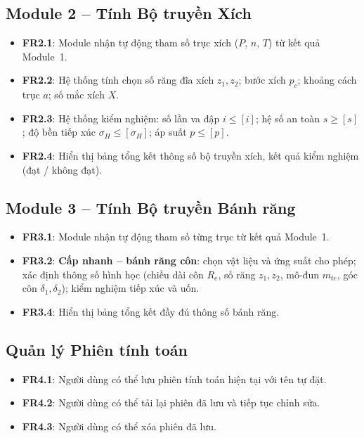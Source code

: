 \subsection{Module 2 -- Tính Bộ truyền Xích}

\begin{itemize}
  \item \textbf{FR2.1}: Module nhận tự động tham số trục xích
        ($P$, $n$, $T$) từ kết quả Module~1.
  \item \textbf{FR2.2}: Hệ thống tính chọn số răng đĩa xích $z_1, z_2$;
        bước xích $p_c$; khoảng cách trục $a$; số mắc xích $X$.
  \item \textbf{FR2.3}: Hệ thống kiểm nghiệm: số lần va đập $i \leq [i]$;
        hệ số an toàn $s \geq [s]$; độ bền tiếp xúc $\sigma_H \leq [\sigma_H]$;
        áp suất $p \leq [p]$.
  \item \textbf{FR2.4}: Hiển thị bảng tổng kết thông số bộ truyền xích,
        kết quả kiểm nghiệm (đạt / không đạt).
\end{itemize}

\subsection{Module 3 -- Tính Bộ truyền Bánh răng}

\begin{itemize}
  \item \textbf{FR3.1}: Module nhận tự động tham số từng trục từ kết quả Module~1.
  \item \textbf{FR3.2}: \textbf{Cấp nhanh -- bánh răng côn}: chọn vật liệu và ứng suất
        cho phép; xác định thông số hình học (chiều dài côn $R_e$, số răng $z_1, z_2$,
        mô-đun $m_{te}$, góc côn $\delta_1, \delta_2$); kiểm nghiệm tiếp xúc và uốn.
  \item \textbf{FR3.4}: Hiển thị bảng tổng kết đầy đủ thông số bánh răng.
\end{itemize}

\subsection{Quản lý Phiên tính toán}

\begin{itemize}
  \item \textbf{FR4.1}: Người dùng có thể lưu phiên tính toán hiện tại với tên tự đặt.
  \item \textbf{FR4.2}: Người dùng có thể tải lại phiên đã lưu và tiếp tục chỉnh sửa.
  \item \textbf{FR4.3}: Người dùng có thể xóa phiên đã lưu.
\end{itemize}

